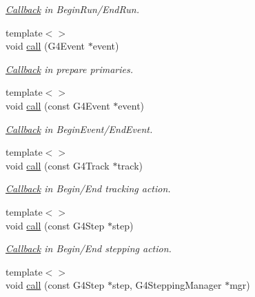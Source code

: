 \begin{DoxyCompactItemize}
\begin{DoxyCompactList}\small\item\em \hyperlink{class_d_d4hep_1_1_callback}{Callback} in Begin\+Run/\+End\+Run. \end{DoxyCompactList}\item 
{\footnotesize template$<$$>$ }\\void \hyperlink{class_d_d4hep_1_1_simulation_1_1_geant4_action_phase_a9ca732b90a5182ed85e2c4e912ebbe81}{call} (G4\+Event $\ast$event)
\begin{DoxyCompactList}\small\item\em \hyperlink{class_d_d4hep_1_1_callback}{Callback} in prepare primaries. \end{DoxyCompactList}\item 
{\footnotesize template$<$$>$ }\\void \hyperlink{class_d_d4hep_1_1_simulation_1_1_geant4_action_phase_aa123cb33310cc19103e4d45104da93c5}{call} (const G4\+Event $\ast$event)
\begin{DoxyCompactList}\small\item\em \hyperlink{class_d_d4hep_1_1_callback}{Callback} in Begin\+Event/\+End\+Event. \end{DoxyCompactList}\item 
{\footnotesize template$<$$>$ }\\void \hyperlink{class_d_d4hep_1_1_simulation_1_1_geant4_action_phase_a4b22414e6a0bc6e8953cd26148ec9bfd}{call} (const G4\+Track $\ast$track)
\begin{DoxyCompactList}\small\item\em \hyperlink{class_d_d4hep_1_1_callback}{Callback} in Begin/\+End tracking action. \end{DoxyCompactList}\item 
{\footnotesize template$<$$>$ }\\void \hyperlink{class_d_d4hep_1_1_simulation_1_1_geant4_action_phase_a3145119cef0e2e9ce31fc747d82a781b}{call} (const G4\+Step $\ast$step)
\begin{DoxyCompactList}\small\item\em \hyperlink{class_d_d4hep_1_1_callback}{Callback} in Begin/\+End stepping action. \end{DoxyCompactList}\item 
{\footnotesize template$<$$>$ }\\void \hyperlink{class_d_d4hep_1_1_simulation_1_1_geant4_action_phase_aad0b3c79b2bc07c629073c068be77323}{call} (const G4\+Step $\ast$step, G4\+Stepping\+Manager $\ast$mgr)

\end{DoxyCompactItemize}
